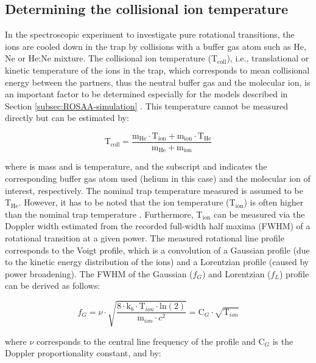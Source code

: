 \subsection{Determining the collisional ion temperature}
\label{subsec:collisional-ion-temperature}

In the spectroscopic experiment to investigate pure rotational transitions, the ions are cooled down in the trap by collisions with a buffer gas atom such as He, Ne or He:Ne mixture. The collisional ion temperature (T$_{\text{coll}}$), i.e., translational or kinetic temperature of the ions in the trap, which corresponds to mean collisional energy between the partners, thus the neutral buffer gas and the molecular ion, is an important factor to be determined especially for the models described in Section \ref{subsec:ROSAA-simulation} . This temperature cannot be measured directly but can be estimated by:

\begin{equation}
    \text{T}_{\text{coll}} = \frac{\text{m}_\text{He} \cdot \text{T}_{\text{ion}}  + \text{m}_\text{ion} \cdot \text{T}_{\text{He}} }{\text{m}_\text{He} + \text{m}_\text{ion}}
    \label{eqn:Tcoll}
\end{equation}

where  is mass and  is temperature, and the subscript  and  indicates the corresponding buffer gas atom used (helium in this case) and the molecular ion of interest, respectively. The nominal trap temperature measured is assumed to be T$_{\text{He}}$. However, it has to be noted that the ion temperature (T$_{\text{ion}}$) is often higher than the nominal trap temperature \cite{endres_incomplete_2017}. Furthermore, T$_{\text{ion}}$ can be measured via the Doppler width estimated from the recorded full-width half maxima (FWHM) of a rotational transition at a given power. The measured rotational line profile corresponds to the Voigt profile, which is a convolution of a Gaussian profile (due to the kinetic energy distribution of the ions) and a Lorentzian profile (caused by power broadening). The FWHM of the Gaussian ($f_G$) and Lorentzian ($f_L$) profile can be derived as follows:


\begin{equation}
    f_G = \nu \cdot \sqrt{\frac{8 \cdot \text{k}_b \cdot \text{T}_{ion} \cdot \text{ln}(2)}{\text{m}_{ion} \cdot c^2}} = \text{C}_G \cdot \sqrt{\text{T}_{ion}}
    \label{eqn:fG}
\end{equation}

where $\nu$ corresponds to the central line frequency of the profile and C$_G$ is the Doppler proportionality constant, and by:

